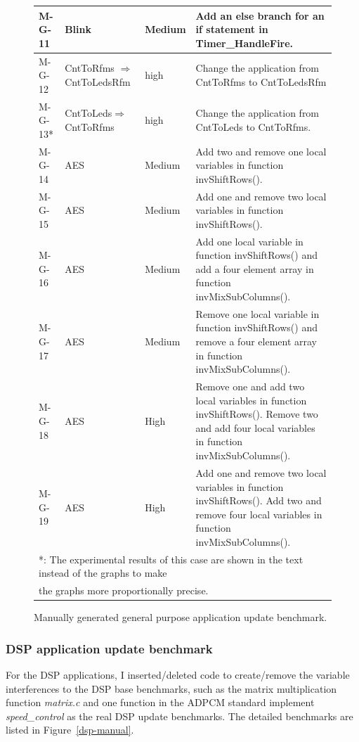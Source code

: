 \begin{figure}[htbp]
\begin{small}
\begin{tabular}{||p{0.6in}|p{1in}|p{0.5in}|p{3.5in}||}
M-G-11 & Blink & Medium & Add an else branch for an if statement in Timer\_HandleFire. \\ \hline

M-G-12 & CntToRfms $\Rightarrow$ CntToLedsRfm &high & Change the application from CntToRfms to CntToLedsRfm \\ \hline 

M-G-13* &CntToLeds$\Rightarrow$ CntToRfms &high & Change the application from CntToLeds to CntToRfms. \\ \hline 

M-G-14 & AES & Medium & Add two and remove one local variables in function invShiftRows().
\\ \hline
M-G-15 & AES & Medium & Add one and remove two local variables in function invShiftRows().
\\ \hline

M-G-16 & AES & Medium & Add one local variable in function invShiftRows() and add a four element array in function invMixSubColumns().\\ \hline
M-G-17 & AES & Medium & Remove one local variable in function invShiftRows() and remove a four element array in function invMixSubColumns().\\ \hline


M-G-18 & AES & High & Remove one and add two local variables in function invShiftRows(). Remove two and add four local variables in function invMixSubColumns().\\ \hline
M-G-19 & AES & High & Add one and remove two local variables in function invShiftRows(). Add two and remove four local variables in function invMixSubColumns().\\ \hline

\multicolumn{4}{l}{*: The experimental results of this case are shown in the text instead of the graphs to make}\\
\multicolumn{4}{l}{the graphs more proportionally precise.}\\
\end{tabular}
\end{small}
\caption{Manually generated general purpose application update benchmark.}
\label{fbench.chg1}
\end{figure}


\subsubsection{DSP application update benchmark}
For the DSP applications, I inserted/deleted code to create/remove the variable interferences to the DSP base benchmarks, such as the matrix multiplication function {\it matrix.c} and one function in the ADPCM standard implement {\it speed\_control} as the real DSP update benchmarks. 
The detailed benchmarks are listed in Figure~\ref{dsp-manual}. 

